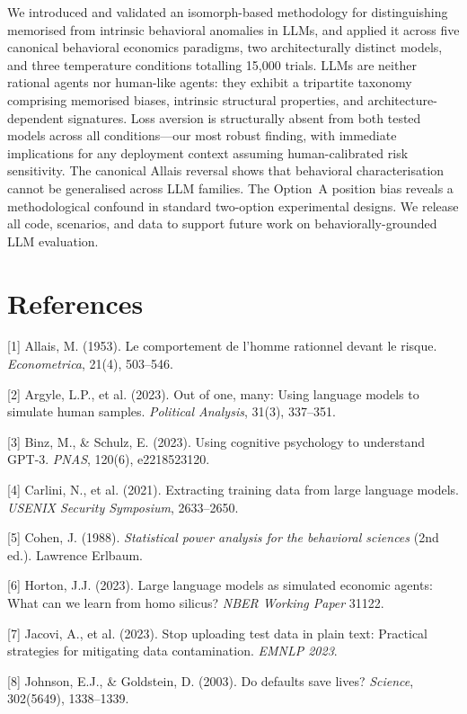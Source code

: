 \documentclass{article}
\begin{document}
We introduced and validated an isomorph-based methodology for distinguishing
memorised from intrinsic behavioral anomalies in LLMs, and applied it across
five canonical behavioral economics paradigms, two architecturally distinct
models, and three temperature conditions totalling 15,000 trials. LLMs are
neither rational agents nor human-like agents: they exhibit a tripartite
taxonomy comprising memorised biases, intrinsic structural properties, and
architecture-dependent signatures. Loss aversion is structurally absent from
both tested models across all conditions---our most robust finding, with
immediate implications for any deployment context assuming human-calibrated
risk sensitivity. The canonical Allais reversal shows that behavioral
characterisation cannot be generalised across LLM families. The Option~A
position bias reveals a methodological confound in standard two-option
experimental designs. We release all code, scenarios, and data to support
future work on behaviorally-grounded LLM evaluation.

\section*{References}

\small

[1] Allais, M. (1953). Le comportement de l'homme rationnel devant le risque.
\textit{Econometrica}, 21(4), 503--546.

[2] Argyle, L.P., et al. (2023). Out of one, many: Using language models to
simulate human samples. \textit{Political Analysis}, 31(3), 337--351.

[3] Binz, M., \& Schulz, E. (2023). Using cognitive psychology to understand
GPT-3. \textit{PNAS}, 120(6), e2218523120.

[4] Carlini, N., et al. (2021). Extracting training data from large language
models. \textit{USENIX Security Symposium}, 2633--2650.

[5] Cohen, J. (1988). \textit{Statistical power analysis for the behavioral
sciences} (2nd ed.). Lawrence Erlbaum.

[6] Horton, J.J. (2023). Large language models as simulated economic agents:
What can we learn from homo silicus? \textit{NBER Working Paper} 31122.

[7] Jacovi, A., et al. (2023). Stop uploading test data in plain text:
Practical strategies for mitigating data contamination. \textit{EMNLP 2023}.

[8] Johnson, E.J., \& Goldstein, D. (2003). Do defaults save lives?
\textit{Science}, 302(5649), 1338--1339.
\end{document}
